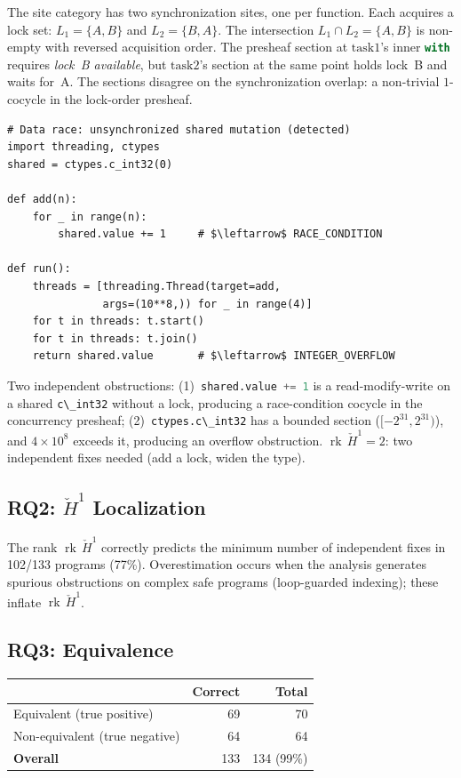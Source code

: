 \documentclass[acmsmall,screen]{acmart}
\theoremstyle{remark}
\newcommand{\Hc}[1]{\check{H}^{#1}}
\newcommand{\rk}{\operatorname{rk}}
\newcommand{\py}[1]{\lstinline[language=Python]{#1}}
\begin{document}
\noindent The site category has two synchronization sites, one per
function.  Each acquires a lock set: $L_1 = \{A, B\}$ and
$L_2 = \{B, A\}$.  The intersection $L_1 \cap L_2 = \{A,B\}$ is
non-empty with reversed acquisition order.  The presheaf section at
$\text{task1}$'s inner \py{with} requires \emph{lock~B available}, but
$\text{task2}$'s section at the same point holds lock~B and waits for~A.
The sections disagree on the synchronization overlap: a non-trivial
$1$-cocycle in the lock-order presheaf.

\begin{lstlisting}
# Data race: unsynchronized shared mutation (detected)
import threading, ctypes
shared = ctypes.c_int32(0)

def add(n):
    for _ in range(n):
        shared.value += 1     # $\leftarrow$ RACE_CONDITION

def run():
    threads = [threading.Thread(target=add,
               args=(10**8,)) for _ in range(4)]
    for t in threads: t.start()
    for t in threads: t.join()
    return shared.value       # $\leftarrow$ INTEGER_OVERFLOW
\end{lstlisting}

\noindent Two independent obstructions: (1)~\py{shared.value += 1}
is a read-modify-write on a shared \py{c\_int32} without a lock,
producing a race-condition cocycle in the concurrency presheaf;
(2)~\py{ctypes.c\_int32} has a bounded section ($[-2^{31}, 2^{31})$),
and $4 \times 10^8$ exceeds it, producing an overflow obstruction.
$\rk\,\Hc{1} = 2$: two independent fixes needed (add a lock, widen
the type).

\subsection{RQ2: $\Hc{1}$ Localization}

The rank $\rk\,\Hc{1}$ correctly predicts the minimum number of
independent fixes in 102/133 programs (77\%).  Overestimation occurs
when the analysis generates spurious obstructions on complex safe
programs (loop-guarded indexing); these inflate $\rk\,\Hc{1}$.

\subsection{RQ3: Equivalence}\label{sec:rq3}

\begin{center}\small
\begin{tabular}{lrr}
\toprule
& \textbf{Correct} & \textbf{Total} \\
\midrule
Equivalent (true positive)     & 69 & 70 \\
Non-equivalent (true negative) & 64 & 64 \\
\textbf{Overall}               & 133 & 134 (99\%)\\
\bottomrule
\end{tabular}
\end{center}
\end{document}
